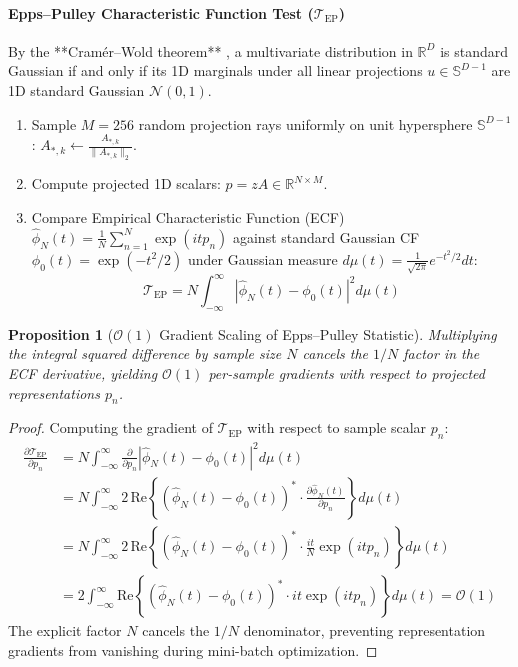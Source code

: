 \documentclass{article}
\newtheorem{proposition}{Proposition}
\begin{document}
\paragraph{Epps--Pulley Characteristic Function Test ($\mathcal{T}_{\text{EP}}$)}
By the **Cram\'er--Wold theorem** \citep{cramer1936theorems}, a multivariate distribution in $\mathbb{R}^D$ is standard Gaussian if and only if its 1D marginals under all linear projections $u \in \mathbb{S}^{D-1}$ are 1D standard Gaussian $\mathcal{N}(0, 1)$.
\begin{enumerate}
    \item Sample $M = 256$ random projection rays uniformly on unit hypersphere $\mathbb{S}^{D-1}$: $A_{*, k} \leftarrow \frac{A_{*, k}}{\|A_{*, k}\|_2}$.
    \item Compute projected 1D scalars: $p = z A \in \mathbb{R}^{N \times M}$.
    \item Compare Empirical Characteristic Function (ECF) $\hat{\phi}_N(t) = \frac{1}{N} \sum_{n=1}^N \exp(i t p_n)$ against standard Gaussian CF $\phi_0(t) = \exp(-t^2/2)$ under Gaussian measure $d\mu(t) = \frac{1}{\sqrt{2\pi}} e^{-t^2/2} dt$:
    \begin{equation}
        \mathcal{T}_{\text{EP}} = N \int_{-\infty}^{\infty} |\hat{\phi}_N(t) - \phi_0(t)|^2 d\mu(t)
    \end{equation}
\end{enumerate}

\begin{proposition}[$\mathcal{O}(1)$ Gradient Scaling of Epps--Pulley Statistic]
\label{prop:sigreg_gradients}
Multiplying the integral squared difference by sample size $N$ cancels the $1/N$ factor in the ECF derivative, yielding $\mathcal{O}(1)$ per-sample gradients with respect to projected representations $p_n$.
\end{proposition}

\begin{proof}
Computing the gradient of $\mathcal{T}_{\text{EP}}$ with respect to sample scalar $p_n$:
\begin{align}
    \frac{\partial \mathcal{T}_{\text{EP}}}{\partial p_n} &= N \int_{-\infty}^\infty \frac{\partial}{\partial p_n} |\hat{\phi}_N(t) - \phi_0(t)|^2 d\mu(t) \\
    &= N \int_{-\infty}^\infty 2 \, \text{Re}\left\{ (\hat{\phi}_N(t) - \phi_0(t))^* \cdot \frac{\partial \hat{\phi}_N(t)}{\partial p_n} \right\} d\mu(t) \\
    &= N \int_{-\infty}^\infty 2 \, \text{Re}\left\{ (\hat{\phi}_N(t) - \phi_0(t))^* \cdot \frac{i t}{N} \exp(i t p_n) \right\} d\mu(t) \\
    &= 2 \int_{-\infty}^\infty \text{Re}\left\{ (\hat{\phi}_N(t) - \phi_0(t))^* \cdot i t \exp(i t p_n) \right\} d\mu(t) = \mathcal{O}(1)
\end{align}
The explicit factor $N$ cancels the $1/N$ denominator, preventing representation gradients from vanishing during mini-batch optimization.
\end{proof}
\end{document}
